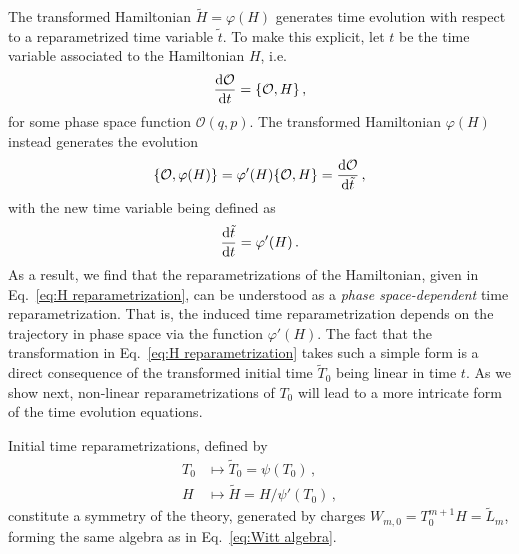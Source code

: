 \documentclass[onecolumn,notitlepage,superscriptaddress, nofootinbib,nobibnotes, aps,prd,10pt]{revtex4-1}%
\begin{document}
The transformed Hamiltonian $\tilde{H} = \varphi(H)$ generates time evolution with respect to a reparametrized time variable $\tilde{t}$. To make this explicit, let $t$ be the time variable associated to the Hamiltonian $H$, i.e. 
%
\begin{equation}
\dv{\mathcal{O}}{t} = \{\mathcal{O},H\}\, ,
\end{equation}
%
for some phase space function $\mathcal{O}(q,p)$. The transformed Hamiltonian $\varphi(H)$ instead generates the evolution
%
\begin{equation}
\{\mathcal{O},\varphi(H)\} = \varphi'(H)\{\mathcal{O},H\} = \dv{\mathcal{O}}{\tilde{t}}\, ,
\end{equation}
%
with the new time variable being defined as
%
\begin{equation}\label{eq:change of clocks}
\dv{\tilde{t}}{t} = \varphi'(H)\, .
\end{equation}
%
As a result, we find that the reparametrizations of the Hamiltonian, given in Eq.~\eqref{eq:H reparametrization}, can be understood as a \textit{phase space-dependent} time reparametrization. That is, the induced time reparametrization depends on the trajectory in phase space via the function $\varphi'(H)$. The fact that the transformation in Eq.~\eqref{eq:H reparametrization} takes such a simple form is a direct consequence of the transformed initial time $\tilde{T}_0$ being linear in time $t$. As we show next, non-linear reparametrizations of $T_0$ will lead to a more intricate form of the time evolution equations. 

Initial time reparametrizations, defined by
%
\begin{subequations}\label{eq:T0 reparametrization}
\begin{align}
    T_0&\mapsto \tilde{T}_0 = \psi(T_0)\, ,\\[7pt]
    H&\mapsto \tilde{H} = H/\psi'(T_0)\, ,\label{eq:T0 reparam: H}
\end{align}
\end{subequations}
%
constitute a symmetry of the theory, generated by charges $W_{m,0} = T_0^{m+1}H=\tilde{L}_m$, forming the same algebra as in Eq.~\eqref{eq:Witt algebra}.
\end{document}

